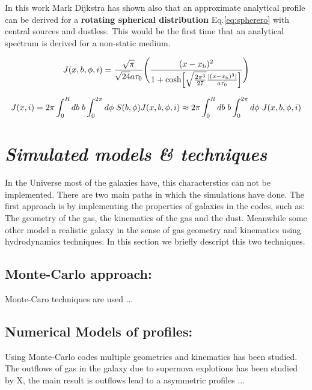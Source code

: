 In this work Mark Dijkstra has shown also that an approximate analytical profile
can be derived for a {\bf{rotating spherical distribution}} Eq.\ref{eq:spherero}
with central sources and dustless. This would be the first time that an analytical
 spectrum is derived for a non-static medium. 

\begin{equation}\label{eq:spherero}
J(x,b,\phi,i)=\frac{\sqrt{\pi}}{\sqrt{24}a\tau_0}\Bigg{(}\frac{(x-x_{\rm
b})^2}{1+{\rm cosh}\Big{[}\sqrt{\frac{2\pi^3}{27}}\frac{|(x
-x_{\rm b})^3|}{a\tau_0}\Big{]}}\Bigg{)}
\end{equation}

\begin{equation}
J(x,i)=2\pi \int_0^Rdb {\hspace{1mm}} b \int_0^{2\pi}d\phi {\hspace{1mm}}
S(b,\phi)J(x,b,\phi,i) \approx 2\pi \int_0^Rdb {\hspace{1mm}} b
\int_0^{2\pi}d\phi {\hspace{1mm}} J(x,b,\phi,i)\\ \nonumber
\end{equation}

\section{\emph{Simulated models \& techniques}}

In the Universe most of the galaxies have, this characterstics
can not be implemented. There are two main paths in which the 
simulations have done. The first approach is by implementing 
the properties of galaxies in the codes, such as: The geometry
of the gas, the kinematics of the gas and the dust. Meanwhile 
some other model a realistic galaxy in the sense of gas geometry
and kinematics using hydrodynamics techniques. In this section 
we briefly descript this two techniques. 

\subsection{Monte-Carlo approach:}

Monte-Caro techniques are used ...

\subsection{Numerical Models of \ly profiles:}

Using Monte-Carlo codes multiple geometries and kinematics has been 
studied. The outflows of gas in the galaxy due to supernova explotions
has been studied by X, the main result is outflows lead to a asymmetric
profiles ...

